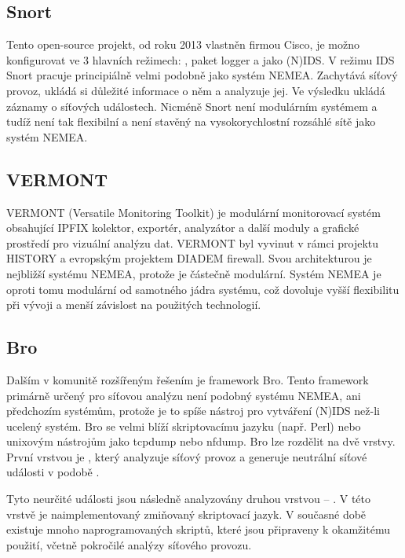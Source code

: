 \subsection*{Snort}
Tento open-source projekt, od roku 2013 vlastněn firmou Cisco\cite{snort:cisco}, je možno konfigurovat ve 3 hlavních režimech\cite{snort:modes}: , paket logger a jako (N)IDS. V režimu IDS Snort pracuje principiálně velmi podobně jako systém NEMEA. Zachytává síťový provoz, ukládá si důležité informace o něm a analyzuje jej. Ve výsledku ukládá záznamy o síťových událostech. Nicméně Snort není modulárním systémem a tudíž není tak flexibilní a není stavěný na vysokorychlostní rozsáhlé sítě jako systém NEMEA.

\subsection*{VERMONT}

VERMONT (Versatile Monitoring Toolkit) je modulární monitorovací systém obsahující IPFIX kolektor, exportér, analyzátor a další moduly a grafické prostředí pro vizuální analýzu dat. VERMONT byl vyvinut v rámci projektu HISTORY\cite{vermont:history} a evropským projektem DIADEM firewall\cite{vermont:diadem}. Svou architekturou je nejbližší systému NEMEA, protože je částečně modulární. Systém NEMEA je oproti tomu modulární od samotného jádra systému, což dovoluje vyšší flexibilitu při vývoji a menší závislost na použitých technologií.

\subsection*{Bro}
Dalším v komunitě rozšířeným řešením je framework Bro. Tento framework primárně určený pro síťovou analýzu není podobný systému NEMEA, ani předchozím systémům, protože je to spíše nástroj pro vytváření (N)IDS než-li ucelený systém. Bro se velmi blíží skriptovacímu jazyku (např. Perl) nebo unixovým nástrojům jako tcpdump nebo nfdump. Bro lze rozdělit na dvě vrstvy. První vrstvou je , který analyzuje síťový provoz a generuje neutrální síťové události v podobě . 

Tyto neurčité události jsou následně analyzovány druhou vrstvou -- . V této vrstvě je naimplementovaný zmiňovaný skriptovací jazyk. V současné době existuje mnoho naprogramovaných skriptů, které jsou připraveny k okamžitému použití, včetně pokročilé analýzy síťového provozu.

